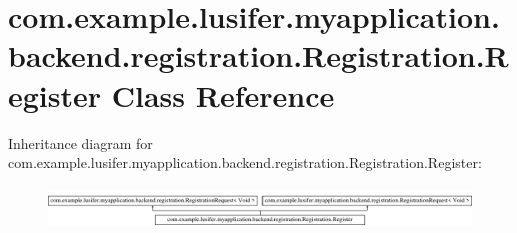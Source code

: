 \hypertarget{classcom_1_1example_1_1lusifer_1_1myapplication_1_1backend_1_1registration_1_1_registration_1_1_register}{}\section{com.\+example.\+lusifer.\+myapplication.\+backend.\+registration.\+Registration.\+Register Class Reference}
\label{classcom_1_1example_1_1lusifer_1_1myapplication_1_1backend_1_1registration_1_1_registration_1_1_register}
Inheritance diagram for com.\+example.\+lusifer.\+myapplication.\+backend.\+registration.\+Registration.\+Register\+:\begin{figure}[H]
\begin{center}
\leavevmode
\includegraphics[height=1.129032cm]{classcom_1_1example_1_1lusifer_1_1myapplication_1_1backend_1_1registration_1_1_registration_1_1_register}
\end{center}
\end{figure}
